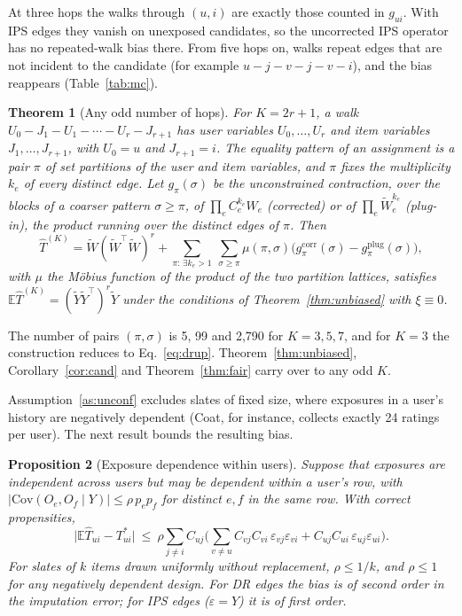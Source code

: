 \documentclass[preprint,review,12pt,authoryear]{elsarticle}
\newtheorem{theorem}{Theorem}
\newtheorem{proposition}[theorem]{Proposition}
\theoremstyle{definition}
\newcommand{\E}{\mathbb{E}}
\newcommand{\tW}{\tilde W}
\newcommand{\tY}{\tilde Y}
\begin{document}
At three hops the walks through $(u,i)$ are exactly those counted in
$g_{ui}$. With IPS edges they vanish on unexposed candidates, so the uncorrected
IPS operator has no repeated-walk bias there. From five hops on, walks repeat
edges that are not incident to the candidate (for example
$u\!-\!j\!-\!v\!-\!j\!-\!v\!-\!i$), and the bias reappears
(Table~\ref{tab:mc}).

\begin{theorem}[Any odd number of hops]\label{thm:khop}
For $K=2r+1$, a walk $U_0\!-\!J_1\!-\!U_1\!-\cdots-\!U_r\!-\!J_{r+1}$ has user
variables $U_0,\dots,U_r$ and item variables $J_1,\dots,J_{r+1}$, with $U_0=u$
and $J_{r+1}=i$. The equality pattern of an assignment is a pair $\pi$ of set
partitions of the user and item variables, and $\pi$ fixes the multiplicity
$k_e$ of every distinct edge. Let $g_\pi(\sigma)$ be the unconstrained
contraction, over the blocks of a coarser pattern $\sigma\ge\pi$, of
$\prod_eC_e^{k_e}W_e$ (corrected) or of $\prod_e\tW_e^{k_e}$ (plug-in), the
product running over the distinct edges of $\pi$. Then
\[
\hat T^{(K)}=\tW(\tW^\top\tW)^r+\sum_{\pi:\,\exists k_e>1}\ \sum_{\sigma\ge\pi}\mu(\pi,\sigma)\big(g^{\mathrm{corr}}_\pi(\sigma)-g^{\mathrm{plug}}_\pi(\sigma)\big),
\]
with $\mu$ the Möbius function of the product of the two partition lattices,
satisfies $\E\hat T^{(K)}=(\tY\tY^\top)^r\tY$ under the conditions of
Theorem~\ref{thm:unbiased} with $\xi\equiv0$.
\end{theorem}
The number of pairs $(\pi,\sigma)$ is 5, 99 and 2{,}790 for $K=3,5,7$, and for
$K=3$ the construction reduces to Eq.~\eqref{eq:drup}. Theorem~\ref{thm:unbiased},
Corollary~\ref{cor:cand} and Theorem~\ref{thm:fair} carry over to any odd $K$.

Assumption~\ref{as:unconf} excludes slates of fixed size, where exposures in a
user's history are negatively dependent (Coat, for instance, collects exactly
24 ratings per user). The next result bounds the resulting bias.

\begin{proposition}[Exposure dependence within users]\label{prop:dep}
Suppose that exposures are independent across users but may be dependent within
a user's row, with $|\mathrm{Cov}(O_e,O_f\mid Y)|\le\rho\,p_ep_f$ for distinct $e,f$ in
the same row. With correct propensities,
\[
\big|\E\hat T_{ui}-T^*_{ui}\big|\ \le\ \rho\sum_{j\neq i}C_{uj}\Big(\sum_{v\neq u}C_{vj}C_{vi}\,\varepsilon_{vj}\varepsilon_{vi}+C_{uj}C_{ui}\,\varepsilon_{uj}\varepsilon_{ui}\Big).
\]
For slates of $k$ items drawn uniformly without replacement, $\rho\le1/k$, and
$\rho\le1$ for any negatively dependent design. For DR edges the bias is of
second order in the imputation error; for IPS edges ($\varepsilon=Y$) it is of
first order.
\end{proposition}
\end{document}
